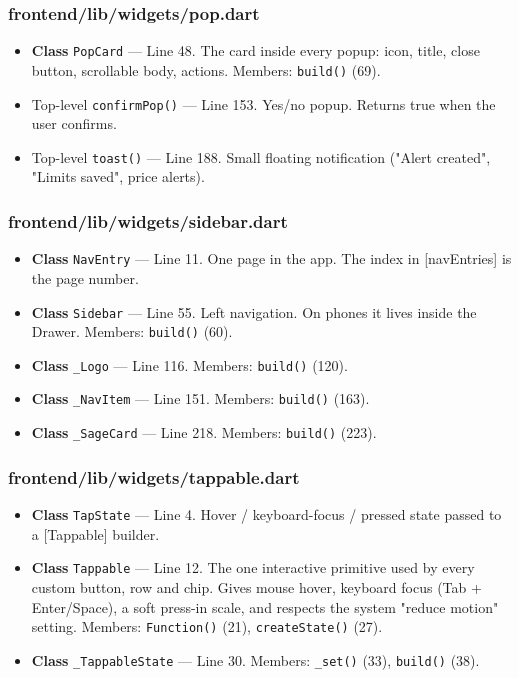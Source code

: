 \subsubsection*{frontend/lib/widgets/pop.dart}
\begin{itemize}[nosep,leftmargin=1.5em]
\item \textbf{Class} \texttt{PopCard} --- Line 48. The card inside every popup: icon, title, close button, scrollable body, actions. Members: \texttt{build(\allowbreak{})} (69).
\item Top-level \texttt{confirmPop(\allowbreak{})} --- Line 153. Yes/no popup. Returns true when the user confirms.
\item Top-level \texttt{toast(\allowbreak{})} --- Line 188. Small floating notification ("Alert created", "Limits saved", price alerts).
\end{itemize}
\subsubsection*{frontend/lib/widgets/sidebar.dart}
\begin{itemize}[nosep,leftmargin=1.5em]
\item \textbf{Class} \texttt{NavEntry} --- Line 11. One page in the app. The index in [navEntries] is the page number.
\item \textbf{Class} \texttt{Sidebar} --- Line 55. Left navigation. On phones it lives inside the Drawer. Members: \texttt{build(\allowbreak{})} (60).
\item \textbf{Class} \texttt{\_\allowbreak{}Logo} --- Line 116. Members: \texttt{build(\allowbreak{})} (120).
\item \textbf{Class} \texttt{\_\allowbreak{}NavItem} --- Line 151. Members: \texttt{build(\allowbreak{})} (163).
\item \textbf{Class} \texttt{\_\allowbreak{}SageCard} --- Line 218. Members: \texttt{build(\allowbreak{})} (223).
\end{itemize}
\subsubsection*{frontend/lib/widgets/tappable.dart}
\begin{itemize}[nosep,leftmargin=1.5em]
\item \textbf{Class} \texttt{TapState} --- Line 4. Hover / keyboard-focus / pressed state passed to a [Tappable] builder.
\item \textbf{Class} \texttt{Tappable} --- Line 12. The one interactive primitive used by every custom button, row and chip. Gives mouse hover, keyboard focus (Tab + Enter/Space), a soft press-in scale, and respects the system "reduce motion" setting. Members: \texttt{Function(\allowbreak{})} (21), \texttt{createState(\allowbreak{})} (27).
\item \textbf{Class} \texttt{\_\allowbreak{}TappableState} --- Line 30. Members: \texttt{\_\allowbreak{}set(\allowbreak{})} (33), \texttt{build(\allowbreak{})} (38).
\end{itemize}
